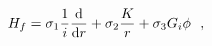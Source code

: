 \begin{equation}
H_f=\sigma_1\frac{1}{i}\frac{{\rm d}}{{\rm d}r}
	+\sigma_2\frac{K}{r}
	+\sigma_3 G_i\phi~~,
\label{Hf.eqn2}
\end{equation}


